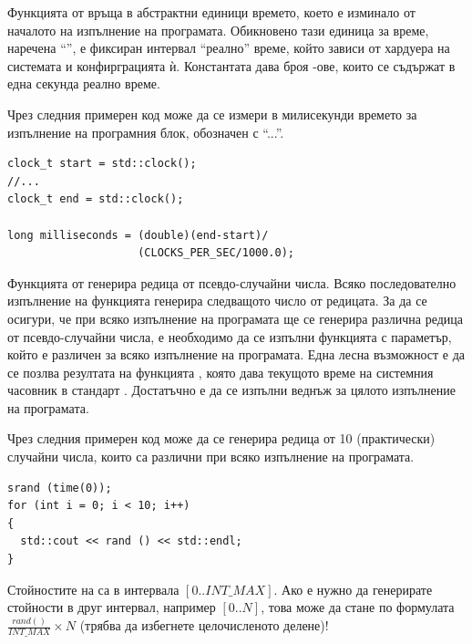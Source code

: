 {\begin{enumerate}[resume]
\end{enumerate}

\begin{mdframed}[hidealllines=true,backgroundcolor=gray!20]
Функцията  от  връща в абстрактни единици времето, което е изминало от началото на изпълнение на програмата. Обикновено тази единица за време, наречена ``'', е фиксиран интервал ``реално'' време, който зависи от хардуера на системата и конфирграцията ѝ. Константата  дава броя -ове, които се съдържат в една секунда реално време.

Чрез следния примерен код може да се измери в милисекунди времето за изпълнение на програмния блок, обозначен с ``...''.
\begin{verbatim}
clock_t start = std::clock();
//...
clock_t end = std::clock();

long milliseconds = (double)(end-start)/
                    (CLOCKS_PER_SEC/1000.0);

\end{verbatim}
\end{mdframed}
\begin{mdframed}[hidealllines=true,backgroundcolor=gray!20]
Функцията  от  генерира редица от псевдо-случайни числа. Всяко последователно изпълнение на функцията генерира следващото число от редицата. За да се осигури, че при всяко изпълнение на програмата ще се генерира различна редица от псевдо-случайни числа, е необходимо да се изпълни функцията  с параметър, който е различен за всяко изпълнение на програмата. Една лесна възможност е да се позлва резултата на функцията , която дава текущото време на системния часовник в стандарт . Достатъчно е  да се изпълни веднъж за цялото изпълнение на програмата.

Чрез следния примерен код може да се генерира редица от 10 (практически) случайни числа, които са различни при всяко изпълнение на програмата.
\begin{verbatim}
srand (time(0));
for (int i = 0; i < 10; i++)
{
  std::cout << rand () << std::endl;
}
\end{verbatim}
Стойностите на  са в интервала $[0..INT\_MAX]$. Ако е нужно да генерирате стойности в друг интервал, например $[0..N]$, това може да стане по формулата $\frac{rand()}{INT\_MAX}\times N$ (трябва да избегнете целочисленото делене)!
\end{mdframed}

}
